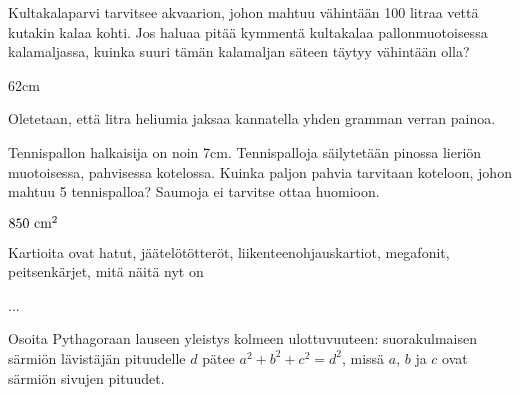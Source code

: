 \begin{tehtavasivu}

\begin{tehtava}
Kultakalaparvi tarvitsee akvaarion, johon mahtuu vähintään 100 litraa vettä kutakin kalaa kohti. Jos haluaa pitää kymmentä kultakalaa pallonmuotoisessa kalamaljassa, kuinka suuri tämän kalamaljan säteen täytyy vähintään olla?
\begin{vastaus}
62cm
\end{vastaus}
\end{tehtava}

\begin{tehtava}
Oletetaan, että litra heliumia jaksaa kannatella yhden gramman verran painoa.
\begin{vastaus}
\end{vastaus}
\end{tehtava}

\begin{tehtava}
Tennispallon halkaisija on noin 7cm. Tennispalloja säilytetään pinossa lieriön muotoisessa, pahvisessa kotelossa. Kuinka paljon pahvia tarvitaan koteloon, johon mahtuu 5 tennispalloa? Saumoja ei tarvitse ottaa huomioon.
\begin{vastaus}
$850~\textnormal{cm}^2$
\end{vastaus}
\end{tehtava}

\begin{tehtava}
Kartioita ovat hatut, jäätelötötteröt, liikenteenohjauskartiot, megafonit, peitsenkärjet, mitä näitä nyt on
\begin{vastaus}
...
\end{vastaus}
\end{tehtava}

\begin{tehtava}
Osoita Pythagoraan lauseen yleistys kolmeen ulottuvuuteen: suorakulmaisen särmiön lävistäjän pituudelle $d$ pätee
$a^2+b^2+c^2=d^2$, missä $a$, $b$ ja $c$ ovat särmiön sivujen pituudet.
\end{tehtava}

\end{tehtavasivu}
